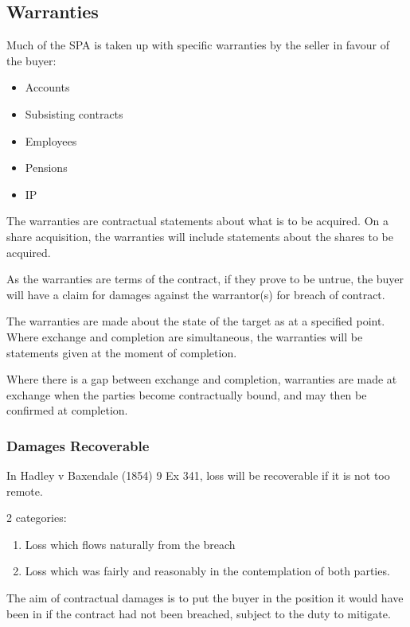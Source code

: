\documentclass[
]{article}
\providecommand{\tightlist}{%
  \setlength{\itemsep}{0pt}\setlength{\parskip}{0pt}}
\begin{document}
\hypertarget{warranties}{%
\subsection{Warranties}\label{warranties}}

Much of the SPA is taken up with specific warranties by the seller in
favour of the buyer:

\begin{itemize}
\tightlist
\item
  Accounts
\item
  Subsisting contracts
\item
  Employees
\item
  Pensions
\item
  IP
\end{itemize}

The warranties are contractual statements about what is to be acquired.
On a share acquisition, the warranties will include statements about the
shares to be acquired.

As the warranties are terms of the contract, if they prove to be untrue,
the buyer will have a claim for damages against the warrantor(s) for
breach of contract.

The warranties are made about the state of the target as at a specified
point. Where exchange and completion are simultaneous, the warranties
will be statements given at the moment of completion.

Where there is a gap between exchange and completion, warranties are
made at exchange when the parties become contractually bound, and may
then be confirmed at completion.

\hypertarget{damages-recoverable}{%
\subsubsection{Damages Recoverable}\label{damages-recoverable}}

In Hadley v Baxendale (1854) 9 Ex 341, loss will be recoverable if it is
not too remote.

2 categories:

\begin{enumerate}
\tightlist
\item
  Loss which flows naturally from the breach
\item
  Loss which was fairly and reasonably in the contemplation of both
  parties.
\end{enumerate}

The aim of contractual damages is to put the buyer in the position it
would have been in if the contract had not been breached, subject to the
duty to mitigate.
\end{document}
